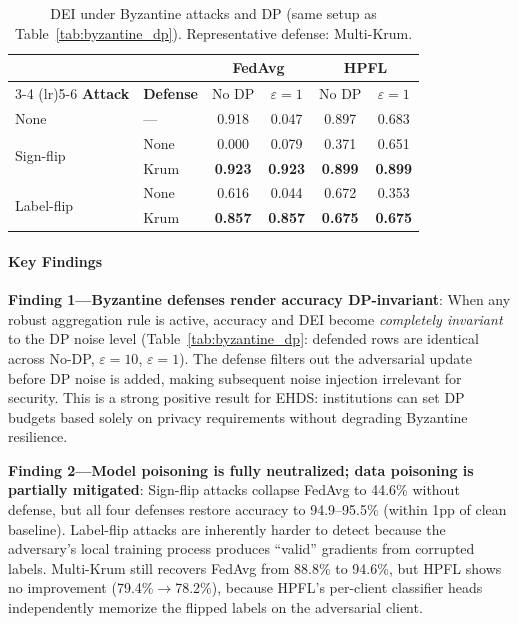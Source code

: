 \documentclass[conference]{IEEEtran}
\begin{document}
\begin{table}[htbp]
\centering
\caption{DEI under Byzantine attacks and DP (same setup as Table~\ref{tab:byzantine_dp}). Representative defense: Multi-Krum.}
\label{tab:byzantine_dp_dei}
\small
\begin{tabular}{ll cc cc}
\toprule
& & \multicolumn{2}{c}{\textbf{FedAvg}} & \multicolumn{2}{c}{\textbf{HPFL}} \\
\cmidrule(lr){3-4} \cmidrule(lr){5-6}
\textbf{Attack} & \textbf{Defense} & No DP & $\varepsilon{=}1$ & No DP & $\varepsilon{=}1$ \\
\midrule
None & --- & 0.918 & 0.047 & 0.897 & 0.683 \\
\midrule
\multirow{2}{*}{Sign-flip}
 & None & 0.000 & 0.079 & 0.371 & 0.651 \\
 & Krum & \textbf{0.923} & \textbf{0.923} & \textbf{0.899} & \textbf{0.899} \\
\midrule
\multirow{2}{*}{Label-flip}
 & None & 0.616 & 0.044 & 0.672 & 0.353 \\
 & Krum & \textbf{0.857} & \textbf{0.857} & \textbf{0.675} & \textbf{0.675} \\
\bottomrule
\end{tabular}
\end{table}

\paragraph{Key Findings}

\textbf{Finding 1---Byzantine defenses render accuracy DP-invariant}: When any robust aggregation rule is active, accuracy and DEI become \textit{completely invariant} to the DP noise level (Table~\ref{tab:byzantine_dp}: defended rows are identical across No-DP, $\varepsilon{=}10$, $\varepsilon{=}1$). The defense filters out the adversarial update before DP noise is added, making subsequent noise injection irrelevant for security. This is a strong positive result for EHDS: institutions can set DP budgets based solely on privacy requirements without degrading Byzantine resilience.

\textbf{Finding 2---Model poisoning is fully neutralized; data poisoning is partially mitigated}: Sign-flip attacks collapse FedAvg to 44.6\% without defense, but all four defenses restore accuracy to 94.9--95.5\% (within 1pp of clean baseline). Label-flip attacks are inherently harder to detect because the adversary's local training process produces ``valid'' gradients from corrupted labels. Multi-Krum still recovers FedAvg from 88.8\% to 94.6\%, but HPFL shows no improvement (79.4\%$\to$78.2\%), because HPFL's per-client classifier heads independently memorize the flipped labels on the adversarial client.
\end{document}
